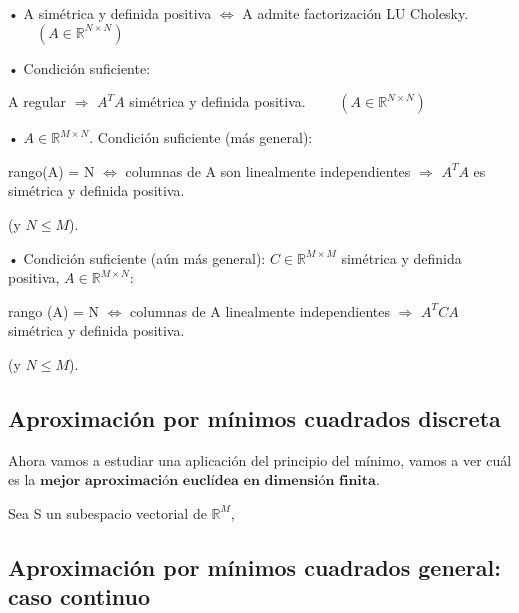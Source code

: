 \begin{nprop}
	\begin{nlist}
	\item[•] A simétrica y definida positiva $\Leftrightarrow$ A admite factorización LU Cholesky. $\qquad (A \in \mathbb{R}^{N \times N})$
	
	\item[•] Condición suficiente:
	
	A regular $\Rightarrow$ $A^TA$ simétrica y definida positiva. $\qquad (A \in \mathbb{R}^{N \times N})$
	
	\item[•] $A \in \mathbb{R}^{M \times N}$. Condición suficiente (más general):
	
	rango(A) = N $\Leftrightarrow$ columnas de A son linealmente independientes $\Rightarrow$ $A^TA$ es simétrica y definida positiva.
	
	(y $N \leq M$).
	
	\item[•] Condición suficiente (aún más general): $C \in \mathbb{R}^{M \times M}$ simétrica y definida positiva, $A \in \mathbb{R}^{M \times N}$:
	
	rango (A) = N $\Leftrightarrow$ columnas de A linealmente independientes $\Rightarrow$ $A^TCA$ simétrica y definida positiva.
	
	(y $N \leq M$).
	
	\end{nlist}
\end{nprop}

\subsection{Aproximación por mínimos cuadrados discreta}
Ahora vamos a estudiar una aplicación del principio del mínimo, vamos a ver cuál es la $\textbf{mejor aproximación euclídea en dimensión finita.}$

Sea S un subespacio vectorial de $\mathbb{R}^M$, %


\subsection{Aproximación por mínimos cuadrados general: caso continuo}

